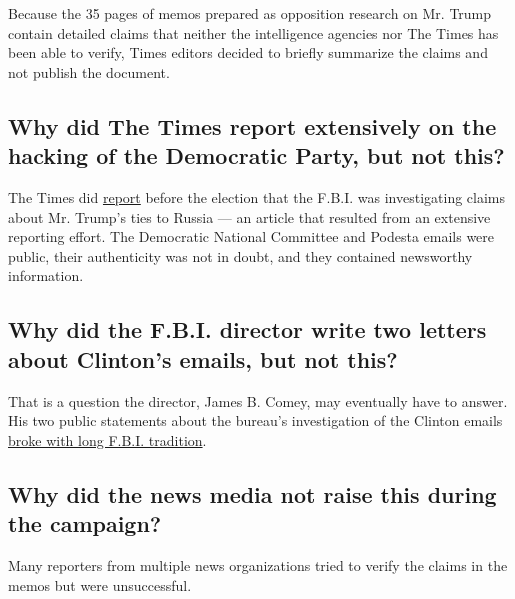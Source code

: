 Because the 35 pages of memos prepared as opposition research on Mr.
Trump contain detailed claims that neither the intelligence agencies nor
The Times has been able to verify, Times editors decided to briefly
summarize the claims and not publish the document.

\hypertarget{why-did-the-times-report-extensively-on-the-hacking-of-the-democratic-party-but-not-this}{%
\subsection{Why did The Times report extensively on the hacking of the
Democratic Party, but not
this?}\label{why-did-the-times-report-extensively-on-the-hacking-of-the-democratic-party-but-not-this}}

The Times did
\href{https://www.nytimes.com/2016/11/01/us/politics/fbi-russia-election-donald-trump.html}{report}
before the election that the F.B.I. was investigating claims about Mr.
Trump's ties to Russia --- an article that resulted from an extensive
reporting effort. The Democratic National Committee and Podesta emails
were public, their authenticity was not in doubt, and they contained
newsworthy information.

\hypertarget{why-did-the-fbi-director-write-two-letters-about-clintons-emails-but-not-this}{%
\subsection{Why did the F.B.I. director write two letters about
Clinton's emails, but not
this?}\label{why-did-the-fbi-director-write-two-letters-about-clintons-emails-but-not-this}}

That is a question the director, James B. Comey, may eventually have to
answer. His two public statements about the bureau's investigation of
the Clinton emails
\href{http://www.nytimes.com/2016/10/30/us/politics/comey-clinton-email-justice.html}{broke
with long F.B.I. tradition}.

\hypertarget{why-did-the-news-media-not-raise-this-during-the-campaign}{%
\subsection{Why did the news media not raise this during the
campaign?}\label{why-did-the-news-media-not-raise-this-during-the-campaign}}

Many reporters from multiple news organizations tried to verify the
claims in the memos but were unsuccessful.

